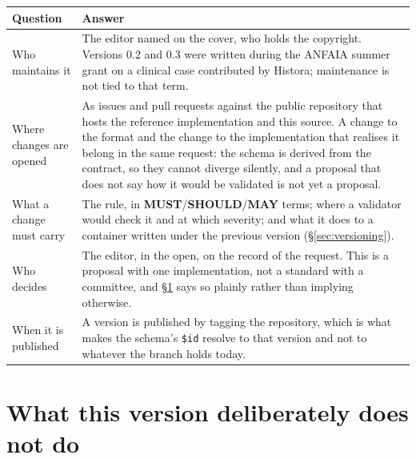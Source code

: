 \documentclass[11pt,a4paper]{article}
\newcommand{\MUST}{\textcolor{uosred}{\textbf{MUST}}}
\newcommand{\SHOULD}{\textcolor{uosamber}{\textbf{SHOULD}}}
\newcommand{\MAY}{\textcolor{uosgreen}{\textbf{MAY}}}
\newcommand{\code}[1]{\texttt{\small #1}}
\begin{document}
\begin{longtable}{L{3.4cm} L{12.0cm}}
\toprule
\textbf{Question} & \textbf{Answer}\\
\midrule
\endhead
Who maintains it & The editor named on the cover, who holds the copyright. Versions 0.2
and 0.3 were written during the ANFAIA summer grant on a clinical case contributed by
Histora; maintenance is not tied to that term.\\
Where changes are opened & As issues and pull requests against the public repository that
hosts the reference implementation and this source. A change to the format and the change
to the implementation that realises it belong in the same request: the schema is derived
from the contract, so they cannot diverge silently, and a proposal that does not say how it
would be validated is not yet a proposal.\\
What a change must carry & The rule, in \MUST/\SHOULD/\MAY{} terms; where a validator would
check it and at which severity; and what it does to a container written under the previous
version (\S\ref{sec:versioning}).\\
Who decides & The editor, in the open, on the record of the request. This is a proposal
with one implementation, not a standard with a committee, and \S\ref{sec:limits} says so
plainly rather than implying otherwise.\\
When it is published & A version is published by tagging the repository, which is what
makes the schema's \code{\$id} resolve to that version and not to whatever the branch holds
today.\\
\bottomrule
\end{longtable}

\section{What this version deliberately does not do}\label{sec:limits}
\end{document}
